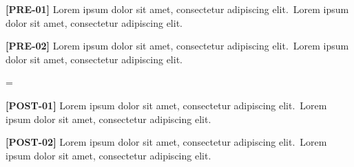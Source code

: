 \documentclass[twocolumn]{article}
\newcommand\Body{Lorem ipsum dolor sit amet, consectetur adipiscing elit.}
\newcommand\Par[1]{\par\textbf{[#1]} \Body\ \Body\par\medskip}
\begin{document}
\Par{PRE-01}\Par{PRE-02}
\begin{wideband}[rules=none]
  \centering{}
\end{wideband}
\makeatletter
\ifnum\fixture@syncs=\@ne\else
  \PackageError{fixture}{host sync ran \the\fixture@syncs\space times, expected once}{}\fi
\makeatother
\Par{POST-01}\Par{POST-02}
\end{document}
